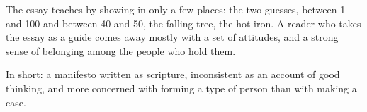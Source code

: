 \begin{afterword}
The essay teaches by showing in only a few places: the two guesses, between 1 and 100 and between 40 and 50, the falling tree, the hot iron. A reader who takes the essay as a guide comes away mostly with a set of attitudes, and a strong sense of belonging among the people who hold them.

In short: a manifesto written as scripture, inconsistent as an account of good thinking, and more concerned with forming a type of person than with making a case.
\end{afterword}
